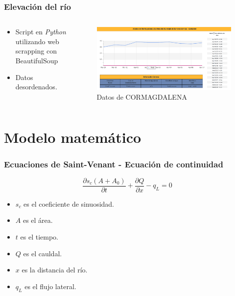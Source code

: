 \documentclass[17pt, t, lualatex]{beamer}
\begin{document}
\begin{frame}
  \frametitle{Elevación del río}

  \begin{columns}
    \begin{column}{.3\textwidth}
      \begin{itemize}
        \item Script en \textit{Python} utilizando web scrapping con BeautifulSoup
        \item Datos desordenados.
      \end{itemize}
    \end{column}

    \begin{column}{.7\textwidth}
      \begin{figure}[ht]
        \centering
        \includegraphics[width=1\textwidth]{img/Barran.png}
        \caption{Datos de CORMAGDALENA\cite{cormagdalena_niveles}}
      \end{figure}
    \end{column}
  \end{columns}

\end{frame}


\section{Modelo matemático}

\insertsectionpage

\begin{frame}
  \frametitle{Ecuaciones de Saint-Venant - Ecuación de continuidad}
  \[
    \frac{\partial s_{c} (A + A_{0})}{\partial t} + \frac{\partial Q}{\partial x} - q_{L} = 0
  \]
  \begin{itemize}
    \item $s_{c}$ es el coeficiente de sinuosidad.
    \item $A$ es el área.
    \item $t$ es el tiempo.
    \item $Q$ es el cauldal.
    \item $x$ es la distancia del río.
    \item $q_{L}$ es el flujo lateral.
  \end{itemize}
\end{frame}
\end{document}
